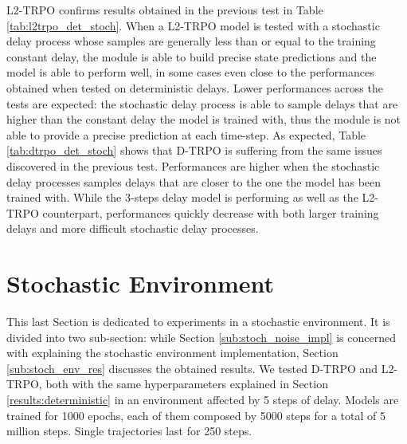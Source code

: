                 L2-TRPO confirms results obtained in the previous test in Table \ref{tab:l2trpo_det_stoch}. When a L2-TRPO model is tested with a stochastic delay process whose samples are generally less than or equal to the training constant delay, the module is able to build precise state predictions and the model is able to perform well, in some cases even close to the performances obtained when tested on deterministic delays. Lower performances across the tests are expected: the stochastic delay process is able to sample delays that are higher than the constant delay the model is trained with, thus the module is not able to provide a precise prediction at each time-step. \newline
                As expected, Table \ref{tab:dtrpo_det_stoch} shows that D-TRPO is suffering from the same issues discovered in the previous test. Performances are higher when the stochastic delay processes samples delays that are closer to the one the model has been trained with. While the 3-steps delay model is performing as well as the L2-TRPO counterpart, performances quickly decrease with both larger training delays and more difficult stochastic delay processes.
            
    \newpage
    \section{Stochastic Environment}
    \label{results:stochastic}
        This last Section is dedicated to experiments in a stochastic environment. It is divided into two sub-section: while Section \ref{sub:stoch_noise_impl} is concerned with explaining the stochastic environment implementation, Section \ref{sub:stoch_env_res} discusses the obtained results. We tested D-TRPO and L2-TRPO, both with the same hyperparameters explained in Section \ref{results:deterministic} in an environment affected by 5 steps of delay. Models are trained for 1000 epochs, each of them composed by 5000 steps for a total of 5 million steps. Single trajectories last for 250 steps. 
        
